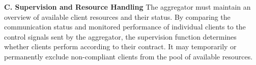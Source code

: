 \textbf{C. Supervision and Resource Handling}
The aggregator must maintain an overview of available client resources and their status. By comparing the communication status and monitored performance of individual clients to the control signals sent by the aggregator, the supervision function determines whether clients perform according to their contract. It may temporarily or permanently exclude non-compliant clients from the pool of available resources.
